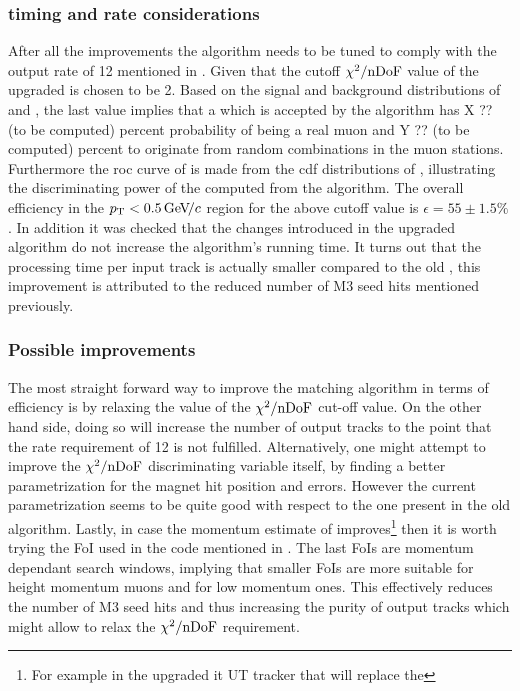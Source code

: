 \subsubsection{\hltone timing and rate considerations}
After all the improvements the \mvTTm algorithm needs to be tuned to comply with the \hltone output rate of 12
\khz mentioned in . Given that the cutoff $\chi^2/{\rm nDoF}$ value of the upgraded \mvTTm is chosen to be 2.
Based on the signal and background distributions of  and , the last value implies that a \veloTrack which
is accepted by the \mvTTm algorithm has {\color{red} X ?? (to be computed)} percent probability of being
a real muon and {\color{red} Y ?? (to be computed)} percent to originate from random combinations in the muon stations.
Furthermore the roc curve of  is made from the cdf distributions of , illustrating
the discriminating power of the \chisq computed from the \mvTTm algorithm.
The overall \mvTTm efficiency in the $\mbox{$p_{\rm T}$}<0.5{\mathrm{\,Ge\kern -0.1em V\!/}c}$ region for the above cutoff value is $\epsilon = 55 \pm 1.5 \%$.
In addition it was checked that the changes introduced in the upgraded \mvTTm algorithm
do not increase the algorithm's running time. It turns out that the processing time per input track is actually
smaller compared to the old \mvm, this improvement is attributed to the reduced number of M3 seed hits mentioned previously.

\subsubsection{Possible improvements}
The most straight forward way to improve the matching algorithm in terms of efficiency is
by relaxing the value of the $\chi^2/{\rm nDoF}$ cut-off value. On the other hand side, doing so will increase the number
of output tracks to the point that the \hltone rate requirement of 12 \khz is not fulfilled.
Alternatively, one might attempt to improve the $\chi^2/{\rm nDoF}$ discriminating variable itself,
by finding a better parametrization for the magnet hit position and errors. However the current
parametrization seems to be quite good with respect to the one present in the old \mvm algorithm.
Lastly, in case the momentum estimate of \ttracker improves\footnote{For example in the upgraded it
UT tracker that will replace the \ttracker} then it is worth trying the FoI used in the \muonID code
mentioned in . The last FoIs are momentum dependant search windows, implying
that smaller FoIs are more suitable for height momentum muons and \viceversa for low momentum ones.
This effectively reduces the number of M3 seed hits and thus increasing the purity of output tracks
which might allow to relax the $\chi^2/{\rm nDoF}$ requirement.
